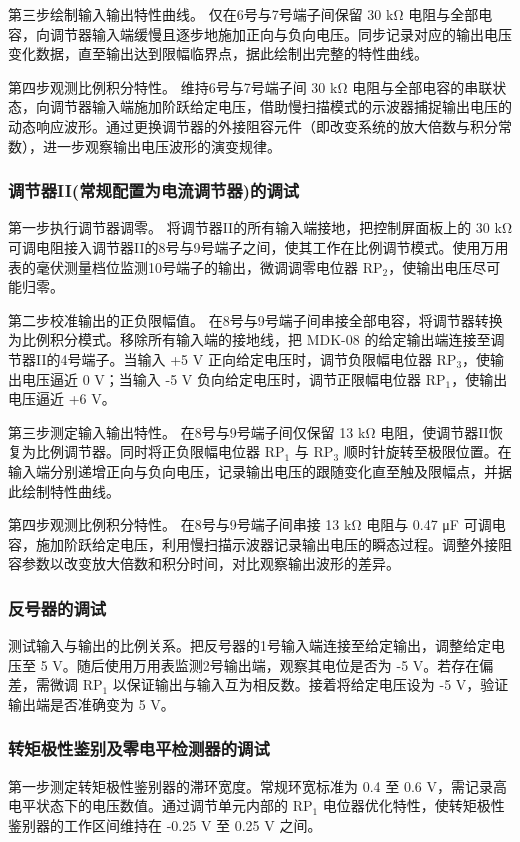 \begin{framed}
{			第三步绘制输入输出特性曲线。
			仅在6号与7号端子间保留 30 kΩ 电阻与全部电容，向调节器输入端缓慢且逐步地施加正向与负向电压。同步记录对应的输出电压变化数据，直至输出达到限幅临界点，据此绘制出完整的特性曲线。
			
			第四步观测比例积分特性。
			维持6号与7号端子间 30 kΩ 电阻与全部电容的串联状态，向调节器输入端施加阶跃给定电压，借助慢扫描模式的示波器捕捉输出电压的动态响应波形。通过更换调节器的外接阻容元件（即改变系统的放大倍数与积分常数），进一步观察输出电压波形的演变规律。
			
			\subsubsection{调节器II(常规配置为电流调节器)的调试}
			第一步执行调节器调零。
			将调节器II的所有输入端接地，把控制屏面板上的 30 kΩ 可调电阻接入调节器II的8号与9号端子之间，使其工作在比例调节模式。使用万用表的毫伏测量档位监测10号端子的输出，微调调零电位器 $\text{RP}_2$，使输出电压尽可能归零。
			
			第二步校准输出的正负限幅值。
			在8号与9号端子间串接全部电容，将调节器转换为比例积分模式。移除所有输入端的接地线，把 MDK-08 的给定输出端连接至调节器II的4号端子。当输入 +5 V 正向给定电压时，调节负限幅电位器 $\text{RP}_3$，使输出电压逼近 0 V；当输入 -5 V 负向给定电压时，调节正限幅电位器 $\text{RP}_1$，使输出电压逼近 +6 V。
			
			第三步测定输入输出特性。
			在8号与9号端子间仅保留 13 kΩ 电阻，使调节器II恢复为比例调节器。同时将正负限幅电位器 $\text{RP}_1$ 与 $\text{RP}_3$ 顺时针旋转至极限位置。在输入端分别递增正向与负向电压，记录输出电压的跟随变化直至触及限幅点，并据此绘制特性曲线。
			
			第四步观测比例积分特性。
			在8号与9号端子间串接 13 kΩ 电阻与 0.47 μF 可调电容，施加阶跃给定电压，利用慢扫描示波器记录输出电压的瞬态过程。调整外接阻容参数以改变放大倍数和积分时间，对比观察输出波形的差异。
			
			\subsubsection{反号器的调试}
			测试输入与输出的比例关系。把反号器的1号输入端连接至给定输出，调整给定电压至 5 V。随后使用万用表监测2号输出端，观察其电位是否为 -5 V。若存在偏差，需微调 $\text{RP}_1$ 以保证输出与输入互为相反数。接着将给定电压设为 -5 V，验证输出端是否准确变为 5 V。
			
			\subsubsection{转矩极性鉴别及零电平检测器的调试}
			第一步测定转矩极性鉴别器的滞环宽度。常规环宽标准为 0.4 至 0.6 V，需记录高电平状态下的电压数值。通过调节单元内部的 $\text{RP}_1$ 电位器优化特性，使转矩极性鉴别器的工作区间维持在 -0.25 V 至 0.25 V 之间。
			
}
\end{framed}
